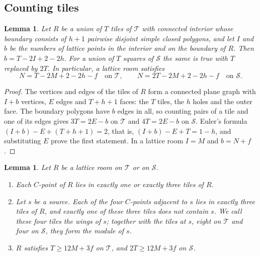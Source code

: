 \documentclass[11pt,a4paper]{article}
\theoremstyle{plain}
\newtheorem{lemma}[theorem]{Lemma}
\theoremstyle{definition}
\theoremstyle{remark}
\newcommand{\T}{\mathcal{T}}
\newcommand{\Sq}{\mathcal{S}}
\numberwithin{equation}{section}
\begin{document}
\subsection{Counting tiles}

\begin{lemma}\label{lem:euler}
Let $R$ be a union of $T$ tiles of $\T$ with connected interior whose boundary consists of $h+1$ pairwise disjoint simple closed polygons, and let $I$ and $b$ be the numbers of lattice points in the interior and on the boundary of $R$. Then $b=T-2I+2-2h$. For a union of $T$ squares of $\Sq$ the same is true with $T$ replaced by $2T$. In particular, a lattice room satisfies
\begin{equation}\label{eq:euler}
N=T-2M+2-2h-f\quad\text{on }\T,\qquad N=2T-2M+2-2h-f\quad\text{on }\Sq.
\end{equation}
\end{lemma}

\begin{proof}
The vertices and edges of the tiles of $R$ form a connected plane graph with $I+b$ vertices, $E$ edges and $T+h+1$ faces: the $T$ tiles, the $h$ holes and the outer face. The boundary polygons have $b$ edges in all, so counting pairs of a tile and one of its edges gives $3T=2E-b$ on $\T$ and $4T=2E-b$ on $\Sq$. Euler's formula $(I+b)-E+(T+h+1)=2$, that is, $(I+b)-E+T=1-h$, and substituting $E$ prove the first statement. In a lattice room $I=M$ and $b=N+f$.
\end{proof}

\begin{lemma}\label{lem:wings}
Let $R$ be a lattice room on $\T$ or on $\Sq$.
\begin{enumerate}[label=\textup{(\alph*)}]
\item Each $C$-point of $R$ lies in exactly one or exactly three tiles of $R$.
\item Let $s$ be a source. Each of the four $C$-points adjacent to $s$ lies in exactly three tiles of $R$, and exactly one of these three tiles does not contain $s$. We call these four tiles the \emph{wings} of $s$; together with the tiles at $s$, eight on $\T$ and four on $\Sq$, they form the \emph{module} of $s$.
\item $R$ satisfies $T\ge12M+3f$ on $\T$, and $2T\ge12M+3f$ on $\Sq$.
\end{enumerate}
\end{lemma}
\end{document}
